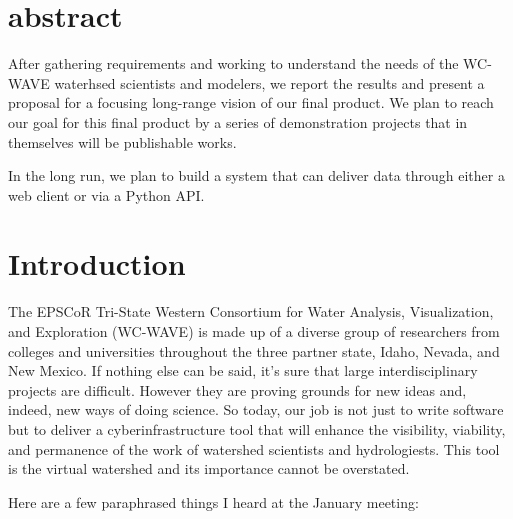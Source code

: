 \documentclass[
11pt, %
a4paper, %
oneside, %
twoside, %
headinclude,footinclude, %
BCOR5mm, %
]{scrartcl}
\title{\normalfont\spacedallcaps{Virtual Watershed Laboratory}} %
\subtitle{\normalfont\spacedallcaps{Plan for 2015: Optimize the Whole}} %
\author{\spacedlowsmallcaps{Matthew A. Turner*}} %
\begin{document}
\maketitle %

\setcounter{tocdepth}{2} %

\tableofcontents %
\section*{abstract}

After gathering requirements and working to understand the needs of the 
WC-WAVE waterhsed scientists and modelers, we report the results and present a
proposal for a focusing long-range vision of our final product. We plan to 
reach our goal for this final product by a series of demonstration projects that
in themselves will be publishable works.

In the long run, we plan to build a system that can deliver data through either
a web client or via a Python API. 

{\let\thefootnote\relax{}}



\newpage
     

\section{Introduction} %
\label{sec:intro}

The EPSCoR Tri-State Western Consortium for Water Analysis, Visualization, and Exploration (WC-WAVE)
is made up of a diverse group of researchers from colleges and universities 
throughout the three partner state, Idaho, Nevada, and New Mexico. If nothing else can be said, it's 
sure that large interdisciplinary projects are difficult. However they are proving grounds for 
new ideas and, indeed, new ways of doing science. So today, our job is not just to write software
but to deliver a cyberinfrastructure tool that will enhance the visibility, viability, and 
permanence of the work of watershed scientists and hydrologiests. This tool is the virtual 
watershed and its importance cannot be overstated.

Here are a few paraphrased things I heard at the January meeting:
\end{document}
